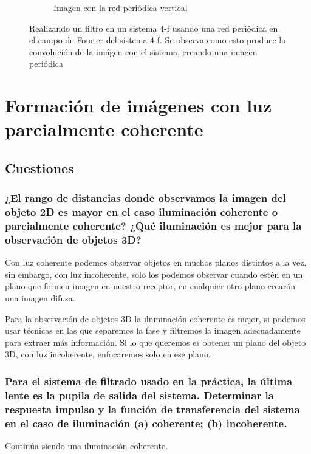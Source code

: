 \documentclass{./packages/optica-article}
\begin{document}
\begin{figure}[hptb]
\begin{center}
\begin{subfigure}[t]{0.3\textwidth}
			\caption{Imagen con la red periódica vertical}
			\label{fig:filtrado:talbot:3}
		\end{subfigure}
		\caption{Realizando un filtro en un sistema 4-f usando una red periódica en el campo de Fourier del sistema 4-f. Se observa como esto produce la convolución de la imágen con el sistema, creando una imagen periódica}
		\label{fig:filtrado:all}
	\end{center}
\end{figure}


\section{Formación de imágenes con luz parcialmente coherente}

\subsection{Cuestiones}
\subsubsection{¿El rango de distancias donde observamos la imagen del objeto 2D es mayor en el caso iluminación coherente o parcialmente coherente? ¿Qué iluminación es mejor para la observación de objetos 3D?}

Con luz coherente podemos observar objetos en muchos planos distintos a la vez, sin embargo, con luz incoherente, solo los podemos observar cuando estén en un plano que formen imagen en nuestro receptor, en cualquier otro plano crearán una imagen difusa.

Para la observación de objetos 3D la iluminación coherente es mejor, si podemos usar técnicas en las que separemos la fase y filtremos la imagen adecuadamente para extraer más información. Si lo que queremos es obtener un plano del objeto 3D, con luz incoherente, enfocaremos solo en ese plano.

\subsubsection{Para el sistema de filtrado usado en la práctica, la última lente es la pupila de salida del sistema. Determinar la respuesta impulso y la función de transferencia del sistema en el caso de iluminación (a) coherente; (b) incoherente.}

Continúa siendo una iluminación coherente.


%
\end{document}
